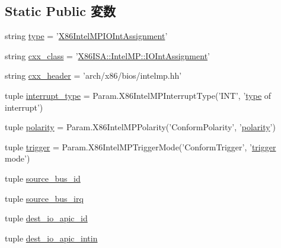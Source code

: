 \subsection*{Static Public 変数}
\begin{DoxyCompactItemize}
\item 
string \hyperlink{classIntelMP_1_1X86IntelMPIOIntAssignment_acce15679d830831b0bbe8ebc2a60b2ca}{type} = '\hyperlink{classIntelMP_1_1X86IntelMPIOIntAssignment}{X86IntelMPIOIntAssignment}'
\item 
string \hyperlink{classIntelMP_1_1X86IntelMPIOIntAssignment_a58cd55cd4023648e138237cfc0822ae3}{cxx\_\-class} = '\hyperlink{classX86ISA_1_1IntelMP_1_1IOIntAssignment}{X86ISA::IntelMP::IOIntAssignment}'
\item 
string \hyperlink{classIntelMP_1_1X86IntelMPIOIntAssignment_a17da7064bc5c518791f0c891eff05fda}{cxx\_\-header} = 'arch/x86/bios/intelmp.hh'
\item 
tuple \hyperlink{classIntelMP_1_1X86IntelMPIOIntAssignment_a47ced18ebb7927f6eede388751a1e331}{interrupt\_\-type} = Param.X86IntelMPInterruptType('INT', '\hyperlink{classIntelMP_1_1X86IntelMPIOIntAssignment_acce15679d830831b0bbe8ebc2a60b2ca}{type} of interrupt')
\item 
tuple \hyperlink{classIntelMP_1_1X86IntelMPIOIntAssignment_aa4bc0ac88ce7c17dc39f4f675e09fc65}{polarity} = Param.X86IntelMPPolarity('ConformPolarity', '\hyperlink{classIntelMP_1_1X86IntelMPIOIntAssignment_aa4bc0ac88ce7c17dc39f4f675e09fc65}{polarity}')
\item 
tuple \hyperlink{classIntelMP_1_1X86IntelMPIOIntAssignment_a36374a82ee2259459ff75b5c4b46f2c9}{trigger} = Param.X86IntelMPTriggerMode('ConformTrigger', '\hyperlink{classIntelMP_1_1X86IntelMPIOIntAssignment_a36374a82ee2259459ff75b5c4b46f2c9}{trigger} mode')
\item 
tuple \hyperlink{classIntelMP_1_1X86IntelMPIOIntAssignment_a6c1f8d95836f7b93621c1a4b51e63fe1}{source\_\-bus\_\-id}
\item 
tuple \hyperlink{classIntelMP_1_1X86IntelMPIOIntAssignment_a42c96669425e02ec03b03caa9826d932}{source\_\-bus\_\-irq}
\item 
tuple \hyperlink{classIntelMP_1_1X86IntelMPIOIntAssignment_aead66195c6e1a64083478fe93c6ce25b}{dest\_\-io\_\-apic\_\-id}
\item 
tuple \hyperlink{classIntelMP_1_1X86IntelMPIOIntAssignment_a1f5e6706032c21ac7793eb365e4e7ade}{dest\_\-io\_\-apic\_\-intin}
\end{DoxyCompactItemize}


